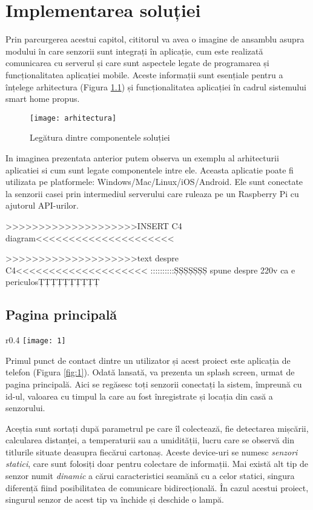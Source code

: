 \chapter{Implementarea soluției}

Prin parcurgerea acestui capitol, cititorul va avea o imagine de ansamblu asupra modului în care senzorii sunt integrați în aplicație, cum este realizată comunicarea cu serverul și care sunt aspectele legate de programarea și funcționalitatea aplicației mobile. Aceste informații sunt esențiale pentru a înțelege arhitectura (Figura \ref{fig:arhitectura}) și funcționalitatea aplicației în cadrul sistemului smart home propus.

\begin{figure}[h]
	\centering
	\texttt{[image: arhitectura]}
	\caption{Legătura dintre componentele soluției}
	\label{fig:arhitectura}
\end{figure}

In imaginea prezentata anterior putem observa un exemplu al arhitecturii aplicatiei si cum sunt legate componentele intre ele. Aceasta aplicatie poate fi utilizata pe platformele: Windows/Mac/Linux/iOS/Android. Ele sunt conectate la senzorii casei prin intermediul serverului care ruleaza pe un Raspberry Pi cu ajutorul API-urilor.

>>>>>>>>>>>>>>>>>>>>INSERT C4 diagram<<<<<<<<<<<<<<<<<<<<<

>>>>>>>>>>>>>>>>>>>>text despre C4<<<<<<<<<<<<<<<<<<<< 
::::::::::ȘȘȘȘȘȘȘ spune despre 220v ca e periculosȚȚȚȚȚȚȚȚȚȚ

\newpage
\section{Pagina principală}

\begin{wrapfigure}{r}{0.4\textwidth}
	\texttt{[image: 1]}
	\caption{Pagina principală}
	\label{fig:1}
\end{wrapfigure}

Primul punct de contact dintre un utilizator și acest proiect este aplicația de telefon (Figura \ref{fig:1}). Odată lansată, va prezenta un splash screen, urmat de pagina principală. Aici se regăsesc toți senzorii conectați la sistem, împreună cu id-ul, valoarea cu timpul la care au fost înregistrate și locația din casă a senzorului. 

Aceștia sunt sortați după parametrul pe care îl colectează, fie detectarea mișcării, calcularea distanței, a temperaturii sau a umidității, lucru care se observă din titlurile situate deasupra fiecărui cartonaș. Aceste device-uri se numesc \emph{senzori statici}, care sunt folosiți doar pentru colectare de informații. Mai există alt tip de senzor numit \emph{dinamic} a cărui caracteristici seamănă cu a celor statici, singura diferență fiind posibilitatea de comunicare bidirecțională. În cazul acestui proiect, singurul senzor de acest tip va închide și deschide o lampă.

